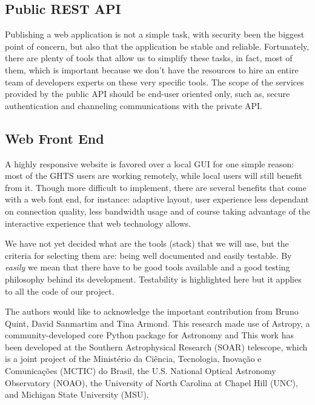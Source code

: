 \documentclass[11pt,twoside]{article}
\begin{document}
\subsection{Public REST API}
Publishing a web application is not a simple task, with security been the biggest point of concern, but also that the application be stable and reliable. Fortunately, there are plenty of tools that allow us to simplify these tasks, in fact, most of them, which is important because we don't have the resources to hire an entire team of developers experts on these very specific tools. The scope of the services provided by the public API should be end-user oriented only, such as, secure authentication and channeling communications with the private API.

\subsection{Web Front End}
A highly responsive website is favored over a local GUI for one simple reason: most of the GHTS users are working remotely, while local users will still benefit from it. Though more difficult to implement, there are several benefits that come with a web font end, for instance: adaptive layout, user experience less dependant on connection quality, less bandwidth usage and of course taking advantage of the interactive experience that web technology allows.

We have not yet decided what are the tools (stack) that we will use, but the criteria for selecting them are: being well documented and easily testable. By \emph{easily} we mean that there have to be good tools available and a good testing philosophy behind its development. Testability is highlighted here but it applies to all the code of our project.


\acknowledgements The authors would like to acknowledge the important contribution from Bruno Quint, David Sanmartim and Tina Armond. This research made use of Astropy, a community-developed core Python package for Astronomy \citet{2013A&A...558A..33A} and \citet{2018AJ....156..123A} This work has been developed at the Southern Astrophysical Research (SOAR) telescope, which is a joint project of the Minist\'erio da Ci\^encia, Tecnologia, Inova\c{c}\~ao e Comunica\c{c}\~oes (MCTIC) do Brasil, the U.S. National Optical Astronomy Observatory (NOAO), the University of North Carolina at Chapel Hill (UNC), and Michigan State University (MSU). 


\end{document}
